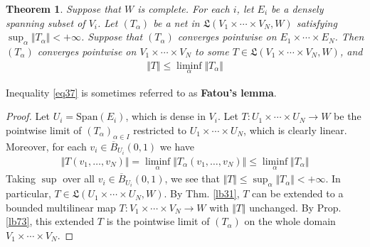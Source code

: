 \documentclass[12pt,b5paper,notitlepage]{article}
\theoremstyle{definition}
\theoremstyle{plain}
\newtheorem{thm}[df]{Theorem}
\newcommand{\fk}{\mathfrak}
\newcommand{\ovl}{\overline}
\newcommand{\Span}{\mathrm{Span}}
\numberwithin{equation}{section}
\begin{document}
\begin{thm}\label{lb32}
Suppose that $W$ is complete. For each $i$, let $E_i$ be a densely spanning subset of $V_i$. Let $(T_\alpha)$ be a net in $\fk L(V_1\times\cdots\times V_N,W)$ satisfying $\sup_\alpha\Vert T_\alpha\Vert<+\infty$. Suppose that $(T_\alpha)$ converges pointwise on $E_1\times\cdots\times E_N$. Then $(T_\alpha)$ converges pointwise on $V_1\times\cdots\times V_N$ to some $T\in\fk L(V_1\times\cdots\times V_N,W)$, and 
\begin{align}\label{eq37}
\Vert T\Vert\leq\liminf_\alpha\Vert T_\alpha\Vert
\end{align}
\end{thm}

Inequality \eqref{eq37} is sometimes referred to as \textbf{Fatou's lemma}.


\begin{proof}
Let $U_i=\Span(E_i)$, which is dense in $V_i$. Let $T:U_1\times\cdots\times U_N\rightarrow W$ be the pointwise limit of $(T_\alpha)_{\alpha\in I}$ restricted to $U_1\times\cdots\times U_N$, which is clearly linear. Moreover, for each $v_i\in\ovl B_{U_i}(0,1)$ we have
\begin{align*}
\Vert T(v_1,\dots,v_N)\Vert=\liminf_\alpha \Vert T_\alpha(v_1,\dots,v_N)\Vert\leq \liminf_\alpha \Vert T_\alpha\Vert
\end{align*}
Taking $\sup$ over all $v_i\in\ovl B_{U_i}(0,1)$, we see that $\Vert T\Vert\leq\sup_\alpha\Vert T_\alpha\Vert<+\infty$. In particular, $T\in\fk L(U_1\times\cdots\times U_N,W)$. By Thm. \ref{lb31}, $T$ can be extended to a bounded multilinear map $T:V_1\times\cdots\times V_N\rightarrow W$ with $\Vert T\Vert$ unchanged. By Prop. \ref{lb73}, this extended $T$ is the pointwise limit of $(T_\alpha)$ on the whole domain $V_1\times\cdots\times V_N$. 
\end{proof}
\end{document}
